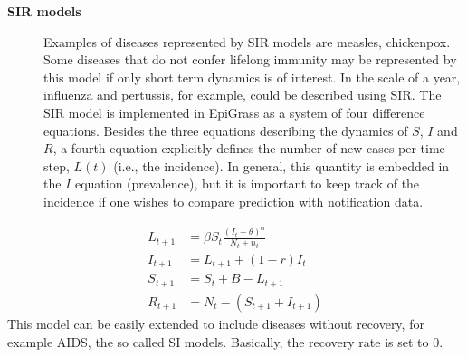 \documentclass[a4paper,10pt,english]{sphinxmanual}
\begin{document}
\begin{description}
\item[{\textbf{SIR models}}] \leavevmode
Examples of diseases represented by SIR models are measles, chickenpox. Some diseases that do not confer lifelong immunity may be represented by this model if only short term dynamics is of interest. In the scale of a year, influenza and pertussis, for example, could be described using SIR. The SIR model is implemented in EpiGrass as a system of four difference equations. Besides the three equations describing the dynamics of \(S\), \(I\) and \(R\), a fourth equation explicitly defines the number of new cases per time step, \(L(t)\) (i.e., the incidence). In general, this quantity is embedded in the \(I\) equation (prevalence), but it is important to keep track of the incidence if one wishes to compare prediction with notification data.

\end{description}
\label{intromodels:equation-E:SIRmodel}\begin{align}
    L_{t+1} &= \beta S_t \frac{(I_t+\theta)^\alpha} {N_t+n_t}\nonumber \\
    I_{t+1} &= L_{t+1} + (1-r)I_t\nonumber\\
    S_{t+1} &= S_t + B - L_{t+1}\nonumber\\
    R_{t+1} &= N_t-(S_{t+1}+I_{t+1})\nonumber
\end{align}
This model can be easily extended to include diseases without recovery, for example AIDS, the so called SI models. Basically, the recovery rate is set to 0.
\end{document}
